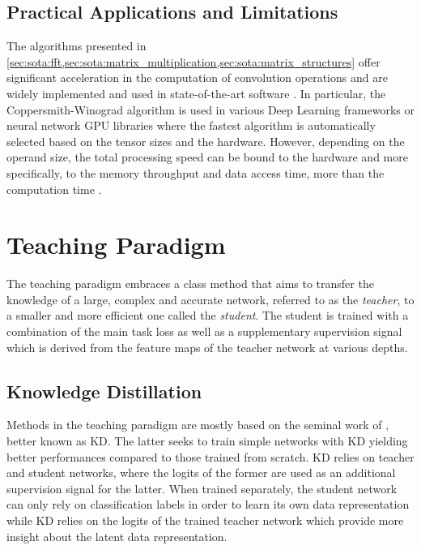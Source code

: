 \subsection{Practical Applications and Limitations}
The algorithms presented in
\cref{sec:sota:fft,sec:sota:matrix_multiplication,sec:sota:matrix_structures}
offer significant acceleration in the computation of convolution operations and
are widely implemented and used in state-of-the-art software
\cite{pytorch_vision,DBLP:journals/corr/AbadiABBCCCDDDG16}. In particular, the
Coppersmith-Winograd algorithm is used in various Deep Learning frameworks
\cite{DBLP:journals/corr/AbadiABBCCCDDDG16,DBLP:conf/nips/PaszkeGMLBCKLGA19} or
neural network \ac{GPU} libraries \cite{nvidia_cudnn} where the fastest
algorithm is automatically selected based on the tensor sizes and the hardware.
However, depending on the operand size, the total processing speed can be bound
to the hardware and more specifically, to the memory throughput and data access
time, more than the computation time
\cite{DBLP:journals/pc/WhaleyPD01,DBLP:journals/cca/DrevetIS10}.\\

\section{Teaching Paradigm}\label{sec:sota:teaching_paradigm}

The teaching paradigm embraces a class method that aims to transfer the
knowledge of a large, complex and accurate network, referred to as the
\emph{teacher}, to a smaller and more efficient one called the \emph{student}.
The student is trained with a combination of the main task loss as well as a
supplementary supervision signal which is derived from the feature maps of the
teacher network at various depths.\\


\subsection{Knowledge Distillation}
Methods in the teaching paradigm are mostly based on the seminal work of
\citeauthor{DBLP:journals/corr/HintonVD15} \cite{DBLP:journals/corr/HintonVD15},
better known as \acf{KD}. The latter seeks to train simple networks with \ac{KD}
yielding better performances compared to those trained from scratch. \ac{KD}
relies on teacher and student networks, where the logits of the former are used
as an additional supervision signal for the latter. When trained separately, the
student network can only rely on classification labels in order to learn its own
data representation while \ac{KD} relies on the logits of the trained teacher
network which provide more insight about the latent data representation.\\


